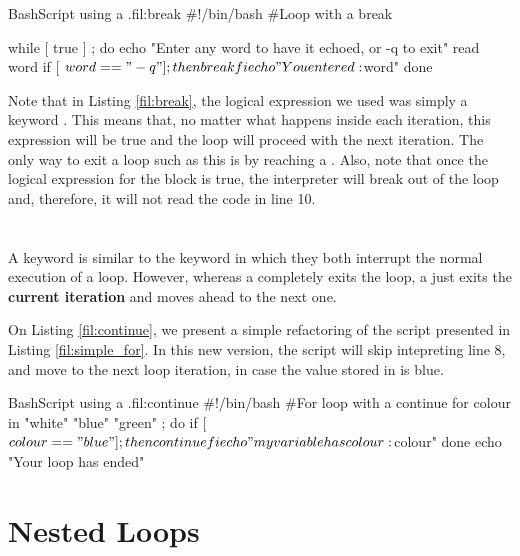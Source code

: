 \begin{source_code_float}{Bash}{Script using a .}{fil:break}
#!/bin/bash
#Loop with a break

while [ true ] ; do
   echo "Enter any word to have it echoed, or -q to exit"
   read word
   if [ $word == "-q" ] ; then
       break
   fi
   echo "You entered: $word"   
done
\end{source_code_float}

Note that in Listing \ref{fil:break}, the logical expression we used was simply a keyword . This means that, no matter what happens inside each iteration, this expression will be true and the loop will proceed with the next iteration. The only way to exit a loop such as this is by reaching a . Also, note that once the logical expression for the  block is true, the interpreter will break out of the loop and, therefore, it will not read the code in line 10.

\section{}
A  keyword is similar to the  keyword in which they both interrupt the normal execution of a loop. However, whereas a  completely exits the loop, a  just exits the \textbf{current iteration} and moves ahead to the next one.

On Listing \ref{fil:continue}, we present a simple refactoring of the script presented in Listing \ref{fil:simple_for}. In this new version, the script will skip intepreting line 8, and move to the next loop iteration, in case the value stored in  is blue. 

\begin{source_code_float}{Bash}{Script using a .}{fil:continue}
#!/bin/bash
#For loop with a continue
for colour in "white" "blue" "green" ; do
    if [ $colour == "blue" ] ; then
        continue
    fi
    echo "my variable has colour: $colour"
done
echo "Your loop has ended"
\end{source_code_float}

\section{Nested Loops}

